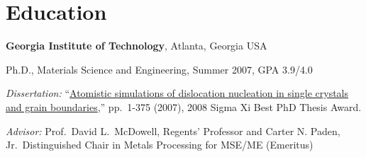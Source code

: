 %
\section{\sc Education}
{\bf Georgia Institute of Technology}, Atlanta, Georgia USA\\
\vspace*{-.1in}
\begin{list1}
\item[] Ph.D., Materials Science and Engineering, Summer 2007, GPA 3.9/4.0
\begin{list2}
\vspace*{.05in}
\item {\em Dissertation:}  ``\href{http://hdl.handle.net/1853/16239}{Atomistic simulations of dislocation nucleation in single crystals and grain boundaries},'' pp.\ 1-375 (2007), 2008 Sigma Xi Best PhD Thesis Award. 
\item {\em Advisor:}  Prof.~David L.~McDowell, Regents' Professor and Carter N. Paden, Jr.\ Distinguished Chair in Metals Processing for MSE/ME (Emeritus)
\end{list2}
\end{list1}

